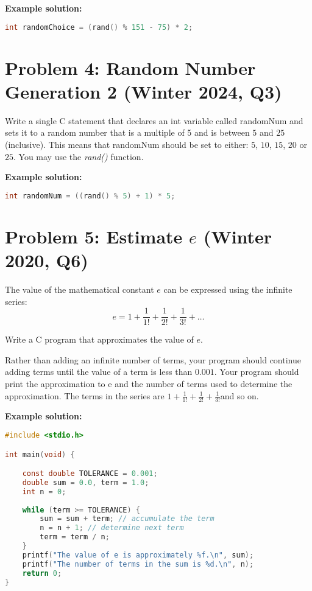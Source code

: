 \documentclass[12pt]{article}
\begin{document}
\textbf{Example solution:}
\begin{lstlisting}[language=C]
int randomChoice = (rand() % 151 - 75) * 2;
\end{lstlisting}

\section*{Problem 4: Random Number Generation 2 (Winter 2024, Q3)}

Write a single C statement that declares an int variable called randomNum and sets it to a random number that is a multiple of 5 and is between $5$ and $25$ (inclusive). This means that randomNum should be set to either: $5$, $10$, $15$, $20$ or $25$. You may use the \textit{rand()} function.

\textbf{Example solution:}
\begin{lstlisting}[language=C]
int randomNum = ((rand() % 5) + 1) * 5;
\end{lstlisting}

\section*{Problem 5: Estimate $e$ (Winter 2020, Q6)}
The value of the mathematical constant $e$ can be expressed using the infinite series: 
\begin{equation}
	e = 1 + \frac{1}{1!}+\frac{1}{2!} +\frac{1}{3!} +\dots
\end{equation}

Write a C program that approximates the value of $e$.

Rather than adding an infinite number of terms, your program should continue adding terms until the value of a term is less than $0.001$. Your program should print the approximation to e and the number of terms used to determine the approximation. The terms in the series are $1 + \frac{1}{1!}+\frac{1}{2!} +\frac{1}{3!}$and so on.

\textbf{Example solution:}
\begin{lstlisting}[language=C]
#include <stdio.h>

int main(void) {

	const double TOLERANCE = 0.001; 
	double sum = 0.0, term = 1.0; 
	int n = 0;
	
	while (term >= TOLERANCE) {
		sum = sum + term; // accumulate the term
		n = n + 1; // determine next term
		term = term / n; 
	}
	printf("The value of e is approximately %f.\n", sum); 
	printf("The number of terms in the sum is %d.\n", n); 
	return 0;
}
\end{lstlisting}
\end{document}

